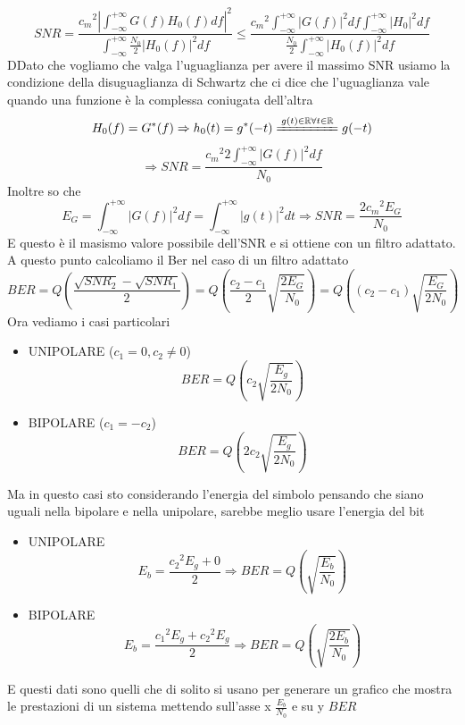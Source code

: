\documentclass{article}
\newcommand{\intfity}{\int_{-\infty}^{+\infty}}
\begin{document}
\[SNR=\frac{{c_m}^2\left|\intfity G(f)H_0(f)df\right|^2}{\intfity\frac{N_0}{2}{|H_0(f)|}^2df}\leq\frac{{c_m}^2\intfity {|G(f)|}^2df\intfity{|H_0|}^2df}{\frac{N_0}{2}\intfity{|H_0(f)|}^2df}\]
DDato che vogliamo che valga l'uguaglianza per avere il massimo SNR usiamo la condizione della disuguaglianza di Schwartz che ci dice che l'uguaglianza vale quando una funzione è la complessa coniugata dell'altra
\[H_0(f)=G^* (f)\Rightarrow h_0(t)=g^*(-t)\xlongequal{g(t)\in\mathbb{R}\forall t\in\mathbb{R}}g(-t)\]
\[\Rightarrow SNR=\frac{{c_m}^2 2\intfity{|G(f)|^2}df}{N_0}\]
Inoltre so che
\[E_G=\intfity {|G(f)|}^2df=\intfity{|g(t)|}^2 dt\Rightarrow SNR=\frac{2{c_m}^2 E_G}{N_0}\]
E questo è il masismo valore possibile dell'SNR e si ottiene con un filtro adattato.\\
A questo punto calcoliamo il Ber nel caso di un filtro adattato
\[BER=Q\left(\frac{\sqrt{SNR_2}-\sqrt{SNR_1}}{2}\right)=Q\left(\frac{c_2-c_1}{2}\sqrt{\frac{2E_G}{N_0}}\right)=Q\left((c_2-c_1)\sqrt{\frac{E_G}{2N_0}}\right)\]
Ora vediamo i casi particolari
\begin{itemize}
    \item UNIPOLARE (\(c_1=0, c_2\neq0\))
        \[BER=Q\left(c_2\sqrt{\frac{E_g}{2N_0}}\right)\]
    \item BIPOLARE (\(c_1=-c_2\))
        \[BER=Q\left(2c_2\sqrt{\frac{E_g}{2N_0}}\right)\]
\end{itemize}
Ma in questo casi sto considerando l'energia del simbolo pensando che siano uguali nella bipolare e nella unipolare, sarebbe meglio usare l'energia del bit
\begin{itemize}
    \item UNIPOLARE
        \[E_b=\frac{{c_2}^2 E_g+0}{2}\Rightarrow BER=Q\left(\sqrt{\frac{E_b}{N_0}}\right)\]
    \item BIPOLARE
        \[E_b=\frac{{c_1}^2 E_g+{c_2}^2 E_g}{2}\Rightarrow BER=Q\left(\sqrt{\frac{2E_b}{N_0}}\right)\]
\end{itemize}
E questi dati sono quelli che di solito si usano per generare un grafico che mostra le prestazioni di un sistema mettendo sull'asse x \(\frac{E_b}{N_0}\) e su y \(BER\)
\end{document}
